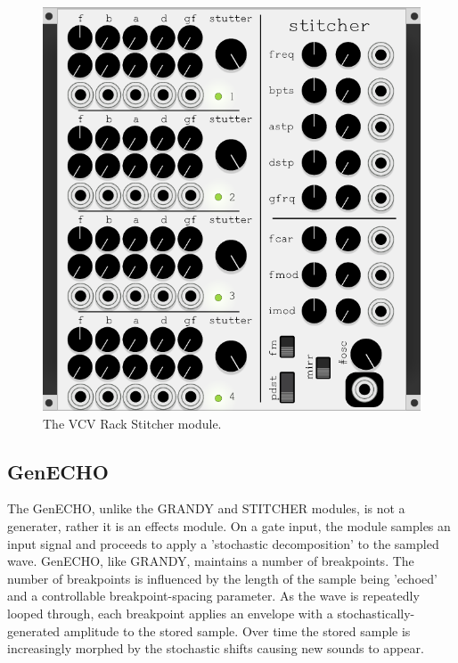 \documentclass[10pt]{article}
\begin{document}
\begin{figure}
  \caption{The VCV Rack Stitcher module.}
  \centering
    \includegraphics[height=0.25\textheight]{stitcher}
\end{figure}

\subsection{GenECHO}
The GenECHO, unlike the GRANDY and STITCHER modules, is not a generater, rather it is an effects module. On a gate input, the module samples an input signal and proceeds to apply a 'stochastic decomposition' to the sampled wave. GenECHO, like GRANDY, maintains a number of breakpoints. The number of breakpoints is influenced by the length of the sample being 'echoed' and a controllable breakpoint-spacing parameter. As the wave is repeatedly looped through, each breakpoint applies an envelope with a stochastically-generated amplitude to the stored sample. Over time the stored sample is increasingly morphed by the stochastic shifts causing new sounds to appear.
\end{document}
